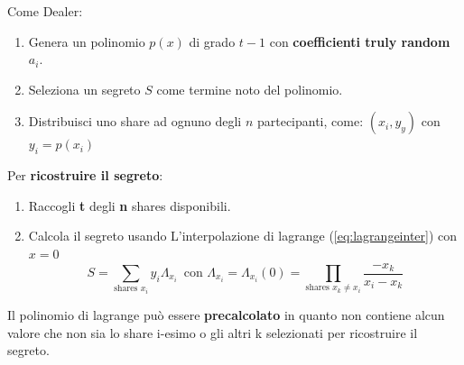 \begin{theorem}\label{thm:tnsecret}
Come Dealer:
\begin{enumerate}
    \item Genera un polinomio $p(x)$ di grado $t-1$ con \textbf{coefficienti truly random} $a_i$.
    \item Seleziona un segreto $S$ come termine noto del polinomio.
    \item Distribuisci uno share ad ognuno degli $n$ partecipanti, come: 
    $(x_i,y_y)$ con $ y_i=p(x_i)$
\end{enumerate}
Per \textbf{ricostruire il segreto}:
\begin{enumerate}
    \item Raccogli \textbf{t} degli \textbf{n} shares disponibili.
    \item Calcola il segreto usando L'interpolazione di lagrange (\cref{eq:lagrangeinter}) con $x=0$
    \begin{equation}\label{eq:tnsecret}
        S=\sum_{\text{shares }x_i}y_i\Lambda_{x_i}\,\,\,\text{con}\,\,\Lambda_{x_i}=\Lambda_{x_i}(0)=\prod_{\text{shares }x_k\ne x_i}\frac{-x_k}{x_i-x_k}
    \end{equation}
\end{enumerate}
\end{theorem}
\begin{note}
Il polinomio di lagrange può essere \textbf{precalcolato} in quanto non contiene alcun valore che non sia lo share i-esimo o gli altri k selezionati per ricostruire il segreto.
\end{note}\pagebreak
